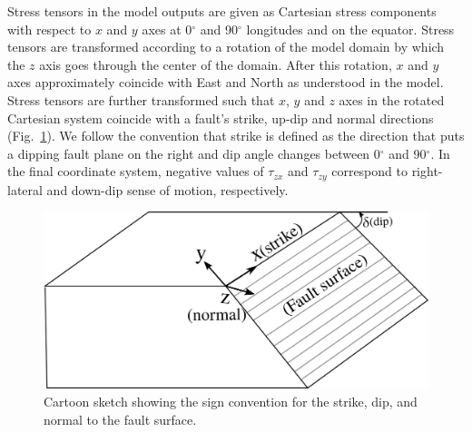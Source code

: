 \documentclass[draft,linenumbers]{agujournal2018}
\begin{document}
Stress tensors in the model outputs are given as Cartesian stress components with respect to $x$ and $y$ axes at 0$^{\circ}$ and 90$^{\circ}$ longitudes and on the equator. Stress tensors are transformed according to a rotation of the model domain by which the $z$ axis goes through the center of the domain. After this rotation, $x$ and $y$ axes approximately coincide with East and North as understood in the model. Stress tensors are further transformed such that $x$, $y$ and $z$ axes in the rotated Cartesian system coincide with a fault\rq{}s strike, up-dip and normal directions (Fig.~\ref{signs}). We follow the convention that strike is defined as the direction that puts a dipping fault plane on the right and dip angle changes between 0$^{\circ}$ and 90$^{\circ}$. %
In the final coordinate system, negative values of $\tau_{zx}$ and $\tau_{zy}$ correspond to right-lateral and down-dip sense of motion, respectively.
%
\begin{figure}[h!]
    \centering
    \includegraphics[width=0.5\linewidth]{figures/sign_convention.png}
    \caption{Cartoon sketch showing the sign convention for the strike, dip, and normal to the fault surface.  }
    \label{signs}
\end{figure}
\end{document}
